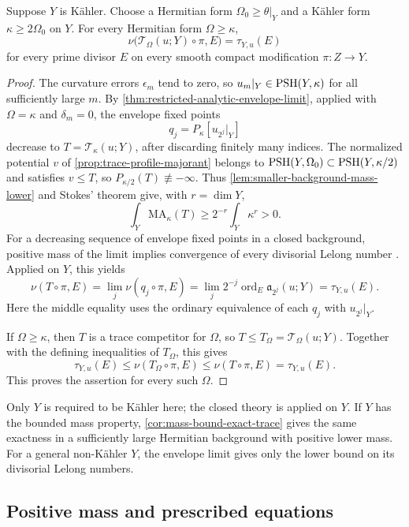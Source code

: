 \begin{theorem}\label{thm:kahler-target-exact-trace}
Suppose $Y$ is K\"ahler. Choose a Hermitian form $\Omega_0\geq\theta|_Y$ and a K\"ahler form $\kappa\geq2\Omega_0$ on $Y$. For every Hermitian form $\Omega\geq\kappa$,
\[
 \nu\bigl(\mathcal T_\Omega(u;Y)\circ\pi,E\bigr)
       =\tau_{Y,u}(E)
\]
for every prime divisor $E$ on every smooth compact modification $\pi\colon Z\to Y$.
\end{theorem}
\begin{proof}
The curvature errors $\epsilon_m$ tend to zero, so $u_m|_Y\in\mathrm{PSH}(Y,\kappa)$ for all sufficiently large $m$. By \cref{thm:restricted-analytic-envelope-limit}, applied with $\Omega=\kappa$ and $\delta_m=0$, the envelope fixed points
\[
 q_j=P_\kappa[u_{2^j}|_Y]
\]
decrease to $T=\mathcal T_\kappa(u;Y)$, after discarding finitely many indices. The normalized potential $v$ of \cref{prop:trace-profile-majorant} belongs to $\mathrm{PSH}(Y,\Omega_0)\subset\mathrm{PSH}(Y,\kappa/2)$ and satisfies $v\leq T$, so $P_{\kappa/2}(T)\not\equiv-\infty$. Thus \cref{lem:smaller-background-mass-lower} and Stokes' theorem give, with $r=\dim Y$,
\[
 \int_Y\mathrm{MA}_\kappa(T)
       \geq2^{-r}\int_Y\kappa^r>0.
\]
For a decreasing sequence of envelope fixed points in a closed background, positive mass of the limit implies convergence of every divisorial Lelong number \cite[Proposition~3.1.12]{SGPT}. Applied on $Y$, this yields
\[
 \nu(T\circ\pi,E)
 =\lim_j\nu(q_j\circ\pi,E)
 =\lim_j2^{-j}\operatorname{ord}_E\mathfrak a_{2^j}(u;Y)
 =\tau_{Y,u}(E).
\]
Here the middle equality uses the ordinary equivalence of each $q_j$ with $u_{2^j}|_Y$.

If $\Omega\geq\kappa$, then $T$ is a trace competitor for $\Omega$, so $T\leq T_\Omega=\mathcal T_\Omega(u;Y)$. Together with the defining inequalities of $T_\Omega$, this gives
\[
 \tau_{Y,u}(E)\leq\nu(T_\Omega\circ\pi,E)
                 \leq\nu(T\circ\pi,E)=\tau_{Y,u}(E).
\]
This proves the assertion for every such $\Omega$.
\end{proof}

Only $Y$ is required to be K\"ahler here; the closed theory is applied on $Y$. If $Y$ has the bounded mass property, \cref{cor:mass-bound-exact-trace} gives the same exactness in a sufficiently large Hermitian background with positive lower mass. For a general non-K\"ahler $Y$, the envelope limit gives only the lower bound on its divisorial Lelong numbers.

\subsection{Positive mass and prescribed equations}

